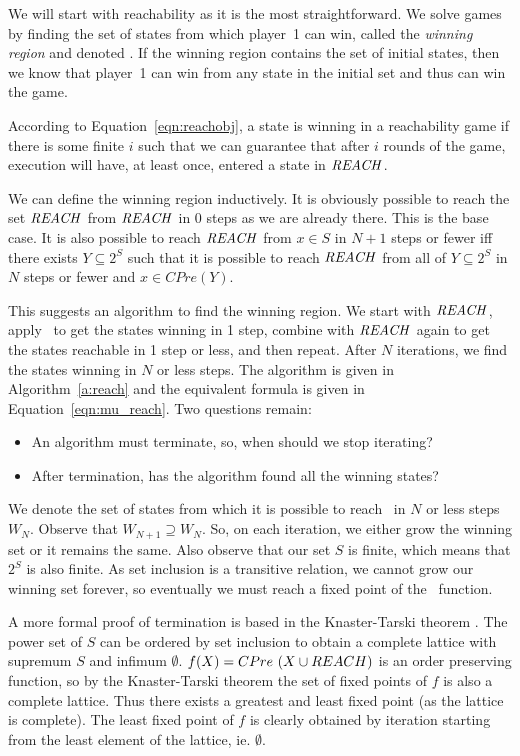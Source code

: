 We will start with reachability as it is the most straightforward. We solve games by finding the set of states from which player~1 can win, called the \emph{winning region} and denoted \win. If the winning region contains the set of initial states, then we know that player~1 can win from any state in the initial set and thus can win the game.

According to Equation~\ref{eqn:reachobj}, a state is winning in a reachability game if there is some finite $i$ such that we can guarantee that after $i$ rounds of the game, execution will have, at least once, entered a state in $\mathit{REACH}$. 

We can define the winning region inductively. It is obviously possible to reach the set $\mathit{REACH}$ from $\mathit{REACH}$ in 0 steps as we are already there. This is the base case. It is also possible to reach $\mathit{REACH}$ from $x \in S$ in $N + 1$ steps or fewer iff there exists $Y\subseteq 2^S$ such that it is possible to reach $\mathit{REACH}$ from all of $Y \subseteq 2^S$ in $N$ steps or fewer and $x \in CPre(Y)$.

This suggests an algorithm to find the winning region. We start with $\mathit{REACH}$, apply \cpre\ to get the states winning in 1 step, combine with $\mathit{REACH}$ again to get the states reachable in 1 step or less, and then repeat. After $N$ iterations, we find the states winning in $N$ or less steps. The algorithm is given in Algorithm~\ref{a:reach} and the equivalent \mucalc formula is given in Equation~\ref{eqn:mu_reach}. Two questions remain: 

\begin{itemize}
    \item An algorithm must terminate, so, when should we stop iterating?
    \item After termination, has the algorithm found all the winning states?
\end{itemize}

We denote the set of states from which it is possible to reach \reach\ in $N$ or less steps $W_N$. Observe that $W_{N+1} \supseteq W_N$. So, on each iteration, we either grow the winning set or it remains the same. Also observe that our set $S$ is finite, which means that $2^S$ is also finite. As set inclusion is a transitive relation, we cannot grow our winning set forever, so eventually we must reach a fixed point of the \cpre\ function. 

A more formal proof of termination is based in the Knaster-Tarski theorem \cite{tarski1955}. The power set of $S$ can be ordered by set inclusion to obtain a complete lattice with supremum $S$ and infimum $\emptyset$. $f(X) = CPre\ (X \cup REACH)$ is an order preserving function, so by the Knaster-Tarski theorem the set of fixed points of $f$ is also a complete lattice. Thus there exists a greatest and least fixed point (as the lattice is complete). The least fixed point of $f$ is clearly obtained by iteration starting from the least element of the lattice, ie. $\emptyset$. 

